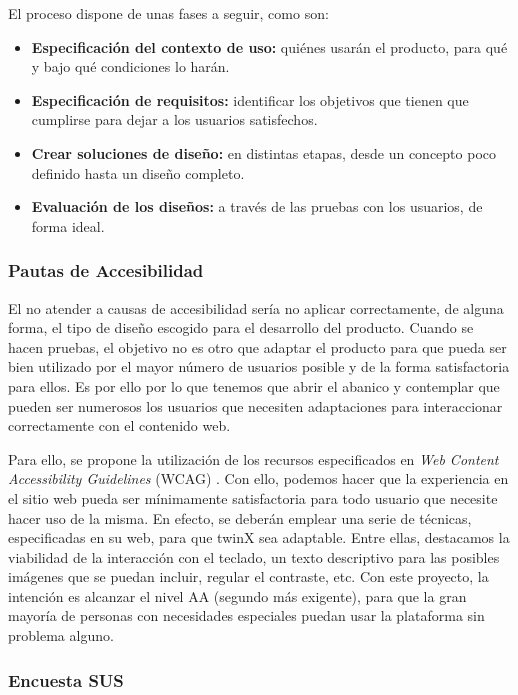 El proceso dispone de unas fases a seguir, como son:
\begin{itemize}
	\item \textbf{Especificación del contexto de uso:} quiénes usarán el producto, para qué y bajo qué condiciones lo harán.
	\item \textbf{Especificación de requisitos:} identificar los objetivos que tienen que cumplirse para dejar a los usuarios satisfechos.
	\item \textbf{Crear soluciones de diseño:} en distintas etapas, desde un concepto poco definido hasta un diseño completo.
	\item \textbf{Evaluación de los diseños:} a través de las pruebas con los usuarios, de forma ideal.
\end{itemize}

\subsubsection{Pautas de Accesibilidad}

El no atender a causas de accesibilidad sería no aplicar correctamente, de alguna forma, el tipo de diseño escogido para el desarrollo del producto. Cuando se hacen pruebas, el objetivo no es otro que adaptar el producto para que pueda ser bien utilizado por el mayor número de usuarios posible y de la forma satisfactoria para ellos. Es por ello por lo que tenemos que abrir el abanico y contemplar que pueden ser numerosos los usuarios que necesiten adaptaciones para interaccionar correctamente con el contenido web.

Para ello, se propone la utilización de los recursos especificados en \textit{Web Content Accessibility Guidelines} (WCAG) \cite{wcag}. Con ello, podemos hacer que la experiencia en el sitio web pueda ser mínimamente satisfactoria para todo usuario que necesite hacer uso de la misma. En efecto, se deberán emplear una serie de técnicas, especificadas en su web, para que twinX sea adaptable. Entre ellas, destacamos la viabilidad de la interacción con el teclado, un texto descriptivo para las posibles imágenes que se puedan incluir, regular el contraste, etc. Con este proyecto, la intención es alcanzar el nivel AA (segundo más exigente), para que la gran mayoría de personas con necesidades especiales puedan usar la plataforma sin problema alguno.

\subsubsection{Encuesta SUS}

